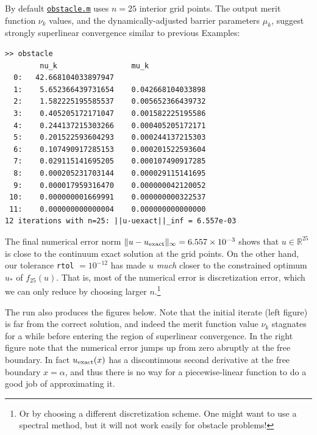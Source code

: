 \documentclass[11pt]{article}
\newcommand{\RR}{\mathbb{R}}
\begin{document}
By default \href{https://github.com/bueler/popdip/blob/main/matlab/obstacle.m}{\texttt{obstacle.m}} uses $n=25$ interior grid points.  The output merit function $\nu_k$ values, and the dynamically-adjusted barrier parameters $\mu_k$, suggest strongly superlinear convergence similar to previous Examples:
\begin{Verbatim}[fontsize=\footnotesize]
>> obstacle
        nu_k                 mu_k
  0:   42.668104033897947
  1:    5.652366439731654    0.042668104033898
  2:    1.582225195585537    0.005652366439732
  3:    0.405205172171047    0.001582225195586
  4:    0.244137215303266    0.000405205172171
  5:    0.201522593604293    0.000244137215303
  6:    0.107490917285153    0.000201522593604
  7:    0.029115141695205    0.000107490917285
  8:    0.000205231703144    0.000029115141695
  9:    0.000017959316470    0.000000042120052
 10:    0.000000001669991    0.000000000322537
 11:    0.000000000000004    0.000000000000000
12 iterations with n=25: ||u-uexact||_inf = 6.557e-03
\end{Verbatim}

The final numerical error norm $\|u-u_{\text{exact}}\|_\infty = 6.557 \times 10^{-3}$ shows that $u\in\RR^{25}$ is close to the continuum exact solution at the grid points.  On the other hand, our tolerance \texttt{rtol} $=10^{-12}$ has made $u$ \emph{much} closer to the constrained optimum $u_*$ of $f_{25}(u)$.  That is, most of the numerical error is discretization error, which we can only reduce by choosing larger $n$.\footnote{Or by choosing a different discretization scheme.  One might want to use a spectral method, but it will not work easily for obstacle problems!}

The run also produces the figures below.  Note that the initial iterate (left figure) is far from the correct solution, and indeed the merit function value $\nu_k$ stagnates for a while before entering the region of superlinear convergence.  In the right figure note that the numerical error jumps up from zero abruptly at the free boundary.  In fact $u_{\text{exact}}(x)$ has a discontinuous second derivative at the free boundary $x=\alpha$, and thus there is no way for a piecewise-linear function to do a good job of approximating it.
\end{document}
